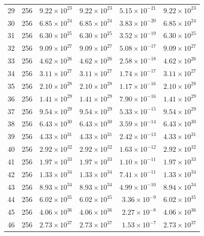 \documentclass[11pt]{article}
\begin{document}
\begin{longtable}{rlrrrr}
29 & 256 & $9.22 \times 10^{23}$ & $9.22 \times 10^{23}$ & $5.15 \times 10^{-21}$ & $9.22 \times 10^{23}$ \\
30 & 256 & $6.85 \times 10^{24}$ & $6.85 \times 10^{24}$ & $3.83 \times 10^{-20}$ & $6.85 \times 10^{24}$ \\
31 & 256 & $6.30 \times 10^{25}$ & $6.30 \times 10^{25}$ & $3.52 \times 10^{-19}$ & $6.30 \times 10^{25}$ \\
32 & 256 & $9.09 \times 10^{27}$ & $9.09 \times 10^{27}$ & $5.08 \times 10^{-17}$ & $9.09 \times 10^{27}$ \\
33 & 256 & $4.62 \times 10^{26}$ & $4.62 \times 10^{26}$ & $2.58 \times 10^{-18}$ & $4.62 \times 10^{26}$ \\
34 & 256 & $3.11 \times 10^{27}$ & $3.11 \times 10^{27}$ & $1.74 \times 10^{-17}$ & $3.11 \times 10^{27}$ \\
35 & 256 & $2.10 \times 10^{28}$ & $2.10 \times 10^{28}$ & $1.17 \times 10^{-16}$ & $2.10 \times 10^{28}$ \\
\midrule
36 & 256 & $1.41 \times 10^{29}$ & $1.41 \times 10^{29}$ & $7.90 \times 10^{-16}$ & $1.41 \times 10^{29}$ \\
37 & 256 & $9.54 \times 10^{29}$ & $9.54 \times 10^{29}$ & $5.33 \times 10^{-15}$ & $9.54 \times 10^{29}$ \\
38 & 256 & $6.43 \times 10^{30}$ & $6.43 \times 10^{30}$ & $3.59 \times 10^{-14}$ & $6.43 \times 10^{30}$ \\
39 & 256 & $4.33 \times 10^{31}$ & $4.33 \times 10^{31}$ & $2.42 \times 10^{-13}$ & $4.33 \times 10^{31}$ \\
40 & 256 & $2.92 \times 10^{32}$ & $2.92 \times 10^{32}$ & $1.63 \times 10^{-12}$ & $2.92 \times 10^{32}$ \\
41 & 256 & $1.97 \times 10^{33}$ & $1.97 \times 10^{33}$ & $1.10 \times 10^{-11}$ & $1.97 \times 10^{33}$ \\
42 & 256 & $1.33 \times 10^{34}$ & $1.33 \times 10^{34}$ & $7.41 \times 10^{-11}$ & $1.33 \times 10^{34}$ \\
43 & 256 & $8.93 \times 10^{34}$ & $8.93 \times 10^{34}$ & $4.99 \times 10^{-10}$ & $8.94 \times 10^{34}$ \\
44 & 256 & $6.02 \times 10^{35}$ & $6.02 \times 10^{35}$ & $3.36 \times 10^{-9}$ & $6.02 \times 10^{35}$ \\
45 & 256 & $4.06 \times 10^{36}$ & $4.06 \times 10^{36}$ & $2.27 \times 10^{-8}$ & $4.06 \times 10^{36}$ \\
46 & 256 & $2.73 \times 10^{37}$ & $2.73 \times 10^{37}$ & $1.53 \times 10^{-7}$ & $2.73 \times 10^{37}$ \\

\end{longtable}
\end{document}
